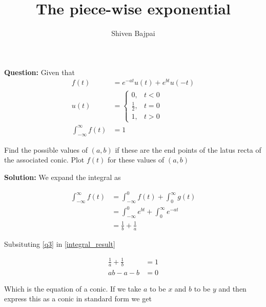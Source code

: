 \documentclass[journal]{IEEEtran}
\begin{document}
\onecolumn

\vspace{3cm}

\renewcommand{\thetable}{\theenumi}

\title{The piece-wise exponential}
\author{Shiven Bajpai}
\maketitle

\renewcommand{\thetable}{\theenumi} 

\setcounter{section}{1}
\textbf{Question: } Given that
\begin{align}
	f(t) &= e^{-at}u(t) + e^{bt}u(-t) \label{q1}\\
	u(t) &= \begin{cases}
		0, & t<0\\
		\frac{1}{2}, & t=0 \\
		1, & t>0
	\end{cases} \label{q2}\\
	\int_{-\infty}^{\infty} f(t) &= 1 \label{q3}
\end{align}

Find the possible values of $(a,b)$ if these are the end points of the latus recta of the associated conic. Plot $f(t)$ for these values of $(a,b)$

\bigskip

\textbf{Solution: } We expand the integral as 

\begin{align}
	\int_{-\infty}^{\infty} f(t) &= \int_{-\infty}^{0} f(t) + \int_{0}^{\infty} g(t)\\
	&= \int_{-\infty}^{0} e^{bt} + \int_{0}^{\infty} e^{-at}\\
	&= \frac{1}{b} + \frac{1}{a} \label{integral_result}
\end{align}

Subsituting \eqref{q3} in \eqref{integral_result}

\begin{align}
	\frac{1}{a} + \frac{1}{b} &= 1\\
	ab - a - b &= 0 \label{conic_ab}
\end{align}

Which is the equation of a conic. 
If we take $a$ to be $x$ and $b$ to be $y$ and then express this as a conic in standard form we get
\end{document}
